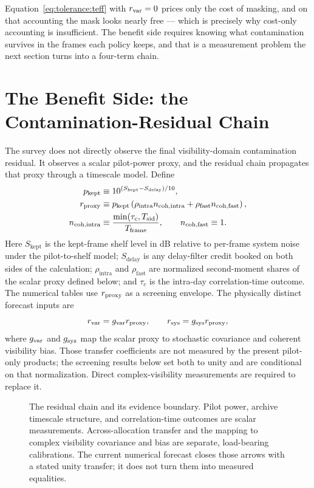 Equation~\eqref{eq:tolerance:teff} with $r_{\rm var} = 0$ prices only the cost of masking, and on that accounting the mask looks nearly free --- which is precisely why cost-only accounting is insufficient. The benefit side requires knowing what contamination survives in the frames each policy keeps, and that is a measurement problem the next section turns into a four-term chain.

\section{The Benefit Side: the Contamination-Residual Chain}
\label{sec:tolerance:chain}

The survey does not directly observe the final visibility-domain contamination residual.  It observes a scalar pilot-power proxy, and the residual chain propagates that proxy through a timescale model.  Define
\begin{align}
\label{eq:tolerance:chain}
p_{\rm kept} &\equiv 10^{(S_{\text{kept}}-S_{\text{delay}})/10},\\
r_{\rm proxy} &\equiv p_{\rm kept}
  \left(\rho_{\text{intra}} n_{\text{coh,intra}}
       +\rho_{\text{fast}} n_{\text{coh,fast}}\right),\\
n_{\text{coh,intra}} &\equiv
  \frac{\min(\tau_c,T_{\text{sid}})}{T_{\text{frame}}},
  \qquad
n_{\text{coh,fast}}\equiv1.
\end{align}
Here $S_{\text{kept}}$ is the kept-frame shelf level in dB relative to per-frame system noise under the pilot-to-shelf model; $S_{\text{delay}}$ is any delay-filter credit booked on both sides of the calculation; $\rho_{\text{intra}}$ and $\rho_{\text{fast}}$ are normalized second-moment shares of the scalar proxy defined below; and $\tau_c$ is the intra-day correlation-time outcome.  The numerical tables use $r_{\rm proxy}$ as a screening envelope.  The physically distinct forecast inputs are
\begin{equation}
  r_{\rm var}=g_{\rm var}r_{\rm proxy},
  \qquad
  r_{\rm sys}=g_{\rm sys}r_{\rm proxy},
  \label{eq:tolerance:transfer}
\end{equation}
where $g_{\rm var}$ and $g_{\rm sys}$ map the scalar proxy to stochastic covariance and coherent visibility bias.  Those transfer coefficients are not measured by the present pilot-only products; the screening results below set both to unity and are conditional on that normalization.  Direct complex-visibility measurements are required to replace it.

\begin{figure}[t]
\centering
\resizebox{\linewidth}{!}{}
\caption[Residual-chain evidence audit]{The residual chain and its evidence
boundary.  Pilot power, archive timescale structure, and correlation-time
outcomes are scalar measurements.  Across-allocation transfer and the mapping to
complex visibility covariance and bias are separate, load-bearing calibrations.
The current numerical forecast closes those arrows with a stated unity transfer;
it does not turn them into measured equalities.}
\label{fig:tolerance:chainaudit}
\end{figure}

